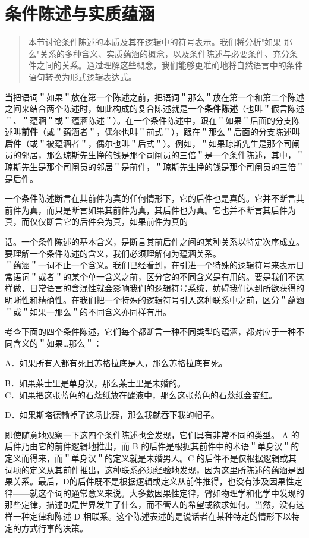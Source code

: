 \section{条件陈述与实质蕴涵}

\begin{quotation}
本节讨论条件陈述的本质及其在逻辑中的符号表示。我们将分析"如果-那么"关系的多种含义、实质蕴涵的概念，以及条件陈述与必要条件、充分条件之间的关系。通过理解这些概念，我们能够更准确地将自然语言中的条件语句转换为形式逻辑表达式。
\end{quotation}

当把语词＂如果＂放在第一个陈述之前，把语词＂那么＂放在第一个和第二个陈述之间来结合两个陈述时，如此构成的复合陈述就是一个\textbf{条件陈述}（也叫＂假言陈述＂、＂蕴涵＂或＂蕴涵陈述＂）。在一个条件陈述中，跟在＂如果＂后面的分支陈述叫\textbf{前件}（或＂蕴涵者＂，偶尔也叫＂前式＂），跟在＂那么＂后面的分支陈述叫\textbf{后件}（或＂被蕴涵者＂，偶尔也叫＂后式＂）。例如，＂如果琼斯先生是那个司闸员的邻居，那么琼斯先生挣的钱是那个司闸员的三倍＂是一个条件陈述，其中，＂琼斯先生是那个司闸员的邻居＂是前件，＂琼斯先生挣的钱是那个司闸员的三倍＂是后件。

一个条件陈述断言在其前件为真的任何情形下，它的后件也是真的。它并不断言其前件为真，而只是断言如果其前件为真，其后件也为真。它也并不断言其后件为真，而仅仅断言它的后件会为真，如果前件为真的

话。一个条件陈述的基本含义，是断言其前后件之间的某种关系以特定次序成立。要理解一个条件陈述的含义，我们必须理解何为蕴涵关系。\\
＂蕴涵＂一词不止一个含义。我们已经看到，在引进一个特殊的逻辑符号来表示日常语词＂或者＂的某个单一含义之前，区分它的不同含义是有用的。要是我们不这样做，日常语言的含混性就会影响我们的逻辑符号系统，妨碍我们达到所欲获得的明晰性和精确性。在我们把一个特殊的逻辑符号引入这种联系中之前，区分＂蕴涵＂或＂如果一那么＂的不同含义亦同样有用。

考查下面的四个条件陈述，它们每个都断言一种不同类型的蕴涵，都对应于一种不同含义的＂如果…那么＂：

A．如果所有人都有死且苏格拉底是人，那么苏格拉底有死。

B．如果莱士里是单身汉，那么莱士里是未婚的。\\
C．如果把这张蓝色的石蕊纸放在酸液中，那么这张蓝色的石蕊纸会变红。

D．如果斯塔德輸掉了这场比赛，那么我就吞下我的帽子。

即使随意地观察一下这四个条件陈述也会发现，它们具有非常不同的类型。 A 的后件乃由它的前件逻辑地推出，而 B 的后件是根据其前件中的术语＂单身汉＂的定义而得来，而＂单身汉＂的定义就是未婚男人。C 的后件不是仅根据逻辑或其词项的定义从其前件推出，这种联系必须经验地发现，因为这里所陈述的蕴涵是因果关系。最后，D的后件既不是根据逻辑或定义从前件推得，也没有涉及因果性定律——就这个词的通常意义来说。大多数因果性定律，臂如物理学和化学中发现的那些定律，描述的是世界发生了什么，而不管人的希望或欲求如何。当然，没有这样一种定律和陈述 D 相联系。这个陈述表述的是说话者在某种特定的情形下以特定的方式行事的决策。

